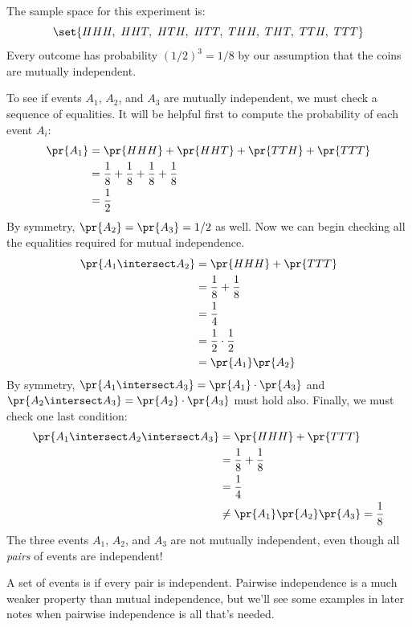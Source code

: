 The sample space for this experiment is:
%
\[
\set{HHH,\ HHT,\ HTH,\ HTT,\ THH,\ THT,\ TTH,\ TTT}
\]
%
Every outcome has probability $(1/2)^3 = 1/8$ by our assumption that
the coins are mutually independent.

To see if events $A_1$, $A_2$, and $A_3$ are mutually independent, we
must check a sequence of equalities.  It will be helpful first to
compute the probability of each event $A_i$:
%
\begin{align*}
\pr{A_1} & = \pr{HHH} + \pr{HHT} + \pr{TTH} + \pr{TTT} \\
         & = \frac{1}{8} + \frac{1}{8} + \frac{1}{8} + \frac{1}{8}\\
         & = \frac{1}{2}
\end{align*}
%
By symmetry, $\pr{A_2} = \pr{A_3} = 1/2$ as well.  Now we can begin
checking all the equalities required for mutual independence.
%
\begin{align*}
\pr{A_1 \intersect A_2}
	& = \pr{HHH} + \pr{TTT} \\
        & = \frac{1}{8} + \frac{1}{8} \\
        & = \frac{1}{4} \\
        & = \frac{1}{2} \cdot \frac{1}{2}\\
        & = \pr{A_1} \pr{A_2}
\end{align*}
%
By symmetry, $\pr{A_1 \intersect A_3} = \pr{A_1} \cdot \pr{A_3}$ and
$\pr{A_2 \intersect A_3} = \pr{A_2} \cdot \pr{A_3}$ must hold also.
Finally, we must check one last condition:
%
\begin{align*}
\pr{A_1 \intersect A_2 \intersect A_3}      & = \pr{HHH} + \pr{TTT} \\
                                & = \frac{1}{8} + \frac{1}{8} \\
                                & = \frac{1}{4} \\
                                & \neq \pr{A_1} \pr{A_2} \pr{A_3} = \frac{1}{8}
\end{align*}
%
The three events $A_1$, $A_2$, and $A_3$ are not mutually independent,
even though all \textit{pairs} of events are independent!

A set of events is  if every pair is
independent.  Pairwise independence is a much weaker property than mutual
independence, but we'll see some examples in later notes when pairwise
independence is all that's needed.


